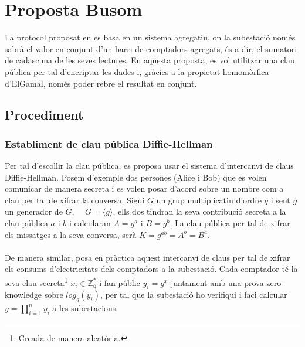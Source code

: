 \documentclass{article}
\begin{document}
\section{Proposta Busom}
La protocol proposat en \cite{busom} es basa en un sistema agregatiu, on la subestació només sabrà el valor en conjunt d'un barri de comptadors agregats, és a dir, el sumatori de cadascuna de les seves lectures. En aquesta proposta, es vol utilitzar una clau pública per tal d'encriptar les dades i, gràcies a la propietat homomòrfica d'ElGamal, només poder rebre el resultat en conjunt.
\subsection{Procediment}
\subsubsection{Establiment de clau pública Diffie-Hellman}
Per tal d'escollir la clau pública, es proposa usar el sistema d'intercanvi de claus Diffie-Hellman. Posem d'exemple dos persones (Alice i Bob) que es volen comunicar de manera secreta i es volen posar d'acord sobre un nombre com a clau per tal de xifrar la conversa. Sigui $G$ un grup multiplicatiu d'ordre $q$ i sent $g$ un generador de $G$, $\quad G = \langle g \rangle$, ells dos tindran la seva contribució secreta a la clau pública $a$ i $b$ i calcularan $A = g^a$ i $B = g^b$. La clau pública per tal de xifrar els missatges a la seva conversa, serà $ K = g^{ab} = A^b = B^a $.\\
\\
De manera similar, \cite{busom} posa en pràctica aquest intercanvi de claus per tal de xifrar els consums d'electricitats dels comptadors a la subestació. Cada comptador té la seva clau secreta\footnote{Creada de manera aleatòria.} $x_i \in \mathbb{Z_q^*} $ i fan públic $y_i = g^x$ juntament amb una prova zero-knowledge sobre $log_g(y_i)$, per tal que la subestació ho verifiqui i faci calcular $y = \prod_{i=1}^{n} y_i$ a les subestacions.
\end{document}
